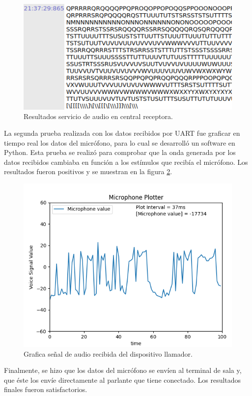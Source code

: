\begin{figure}[htpb]
	\centering
	\includegraphics[scale=0.5]{./Figures/acsCR.png}	
	\caption{Resultados servicio de audio en central receptora.}
	\label{fig:Pacs2}
\end{figure}

La segunda prueba realizada con los datos recibidos por UART fue graficar en tiempo real los datos del micrófono, para lo cual se desarrolló un software en Python. Esta prueba se realizó para comprobar que la onda generada por los datos recibidos cambiaba en función a los estímulos que recibía el micrófono. Los resultados fueron positivos y se muestran en la figura \ref{fig:Psau}.

\begin{figure}[htpb]
	\centering
	\includegraphics[scale=0.6]{./Figures/callpython.png}	
	\caption{Grafica señal de audio recibida del dispositivo llamador.}
	\label{fig:Psau}
\end{figure}

Finalmente, se hizo que los datos del micrófono se envíen al terminal de sala y, que éste los envíe directamente al parlante que tiene conectado. Los resultados finales fueron satisfactorios.


